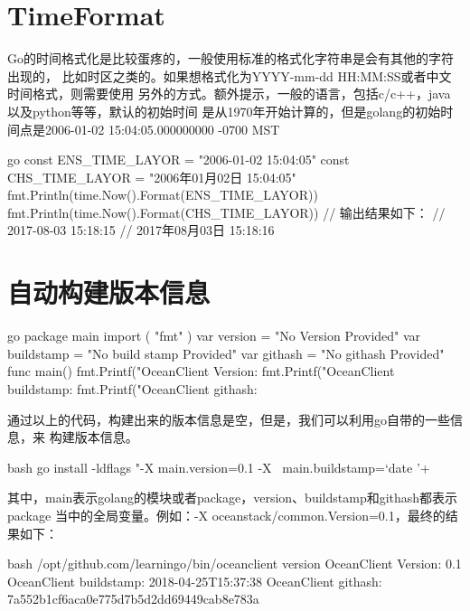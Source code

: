 \section{TimeFormat}
Go的时间格式化是比较蛋疼的，一般使用标准的格式化字符串是会有其他的字符出现的，
比如时区之类的。如果想格式化为YYYY-mm-dd HH:MM:SS或者中文时间格式，则需要使用
另外的方式。额外提示，一般的语言，包括c/c++，java以及python等等，默认的初始时间
是从1970年开始计算的，但是golang的初始时间点是2006-01-02 15:04:05.000000000 -0700 MST
\begin{code-block}{go}
const ENS_TIME_LAYOR = "2006-01-02 15:04:05"
const CHS_TIME_LAYOR = "2006年01月02日 15:04:05"
fmt.Println(time.Now().Format(ENS_TIME_LAYOR))
fmt.Println(time.Now().Format(CHS_TIME_LAYOR))
// 输出结果如下：
// 2017-08-03 15:18:15
// 2017年08月03日 15:18:16
\end{code-block}

\section{自动构建版本信息}
\begin{code-block}{go}
package main
import (
    "fmt"
)
var version = "No Version Provided"
var buildstamp = "No build stamp Provided"
var githash = "No githash Provided"
func main() {
    fmt.Printf("OceanClient Version: %
    fmt.Printf("OceanClient buildstamp: %
    fmt.Printf("OceanClient githash: %
}
\end{code-block}

通过以上的代码，构建出来的版本信息是空，但是，我们可以利用go自带的一些信息，来
构建版本信息。
\begin{code-block}{bash}
go install -ldflags "-X main.version=0.1 -X \
    main.buildstamp=`date '+%
\end{code-block}
其中，main表示golang的模块或者package，version、buildstamp和githash都表示package
当中的全局变量。例如：-X oceanstack/common.Version=0.1，最终的结果如下：
\begin{code-block}{bash}
/opt/github.com/learningo/bin/oceanclient version
OceanClient Version: 0.1
OceanClient buildstamp: 2018-04-25T15:37:38
OceanClient githash: 7a552b1cf6aca0e775d7b5d2dd69449cab8e783a
\end{code-block}
